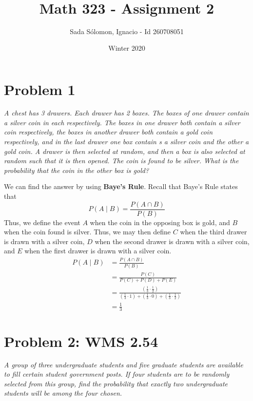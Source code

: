 \documentclass{article}
\title{Math 323
	- Assignment 2}
\author{Sada S\'{o}lomon, Ignacio - Id 260708051}
\date{Winter 2020}  %
\begin{document}
\clearpage\maketitle
\thispagestyle{empty}
\vspace{2cm}

\newpage
\setcounter{page}{1}
\cfoot{\thepage}

\pagebreak

\section*{Problem 1}
	\emph{A chest has 3 drawers. Each drawer has 2 boxes. The boxes of one drawer contain a silver coin in each respectively. The boxes in one drawer both contain a silver coin respectively, the boxes in another drawer both contain a gold coin respectively, and in the last drawer one box contain s a silver coin and the other a gold coin. A drawer is then selected at random, and then a box is also selected at random such that it is then opened. The coin is found to be silver. What is the probability that the coin in the other box is gold?}
	\begin{sol}
		We can find the answer by using \textbf{Baye's Rule}. Recall that Baye's Rule states that
		$$ P(A \mid B) = \frac{P(A \cap B)}{P(B)}$$
		Thus, we define the event $A$ when the coin in the opposing box is gold, and $B$ when the coin found is silver. Thus, we may then define $C$ when the third drawer is drawn with a silver coin, $D$ when the second drawer is drawn with a silver coin, and $E$ when the first drawer is drawn with a silver coin.
		\begin{align*}
			P(A \mid B) &= \frac{P( A \cap B)}{P(B)} \\
			&= \frac{P(C)}{P(C) + P(D) + P(E)} \\
			&= \frac{\left( \frac13 \cdot \frac12 \right)}{\left( \frac13 \cdot 1 \right) + \left(\frac13 \cdot 0\right) + \left( \frac13 \cdot \frac12 \right)} \\
			&= \boxed{\frac13}
		\end{align*}  
	\end{sol}

\pagebreak

\section*{Problem 2: WMS 2.54}
	\emph{A group of three undergraduate students and five graduate students are available to fill certain student government posts. If four students are to be randomly selected from this group, find the probability that exactly two undergraduate students will be among the four chosen.}
	
\end{document}
